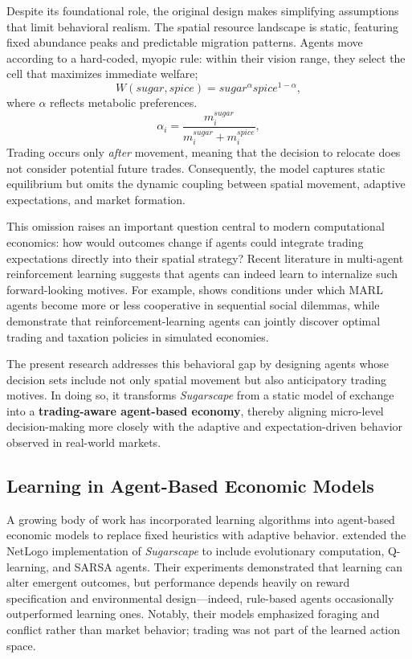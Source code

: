 \documentclass[pdflatex,sn-mathphys-num]{sn-jnl}%
\theoremstyle{thmstyleone}%
\theoremstyle{thmstyletwo}%
\theoremstyle{thmstylethree}%
\begin{document}
Despite its foundational role, the original design makes simplifying assumptions that limit behavioral realism.  
The spatial resource landscape is static, featuring fixed abundance peaks and predictable migration patterns.  
Agents move according to a hard-coded, myopic rule: within their vision range, they select the cell that maximizes immediate welfare;
\[
W(sugar, spice) = sugar^{\alpha} spice^{1-\alpha},
\]
where $\alpha$ reflects metabolic preferences.  
\[
\alpha_i = \frac{m^{sugar}_i}{m^{sugar}_i + m^{spice}_i},
\]
Trading occurs only \emph{after} movement, meaning that the decision to relocate does not consider potential future trades.  
Consequently, the model captures static equilibrium but omits the dynamic coupling between spatial movement, adaptive expectations, and market formation.

This omission raises an important question central to modern computational economics:  
how would outcomes change if agents could integrate trading expectations directly into their spatial strategy?  
Recent literature in multi-agent reinforcement learning suggests that agents can indeed learn to internalize such forward-looking motives.  
For example, \citet{Leibo2017} shows conditions under which MARL agents become more or less cooperative in sequential social dilemmas, while \citet{Zheng2022} demonstrate that reinforcement-learning agents can jointly discover optimal trading and taxation policies in simulated economies. 

The present research addresses this behavioral gap by designing agents whose decision sets include not only spatial movement but also anticipatory trading motives.  
In doing so, it transforms \textit{Sugarscape} from a static model of exchange into a \textbf{trading-aware agent-based economy}, thereby aligning micro-level decision-making more closely with the adaptive and expectation-driven behavior observed in real-world markets.


\subsection{Learning in Agent-Based Economic Models}
A growing body of work has incorporated learning algorithms into agent-based economic models to replace fixed heuristics with adaptive behavior.  
\citet{BrearcliffeCrooks2020} extended the NetLogo implementation of \textit{Sugarscape} to include evolutionary computation, Q-learning, and SARSA agents.  
Their experiments demonstrated that learning can alter emergent outcomes, but performance depends heavily on reward specification and environmental design—indeed, rule-based agents occasionally outperformed learning ones.  
Notably, their models emphasized foraging and conflict rather than market behavior; trading was not part of the learned action space.
\end{document}
